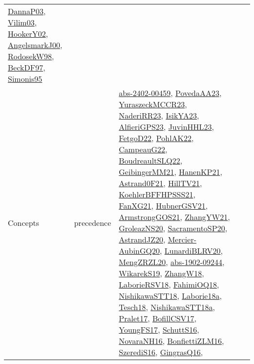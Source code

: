 {\begin{longtable}{lp{3cm}>{\raggedright}p{6cm}>{\raggedright}p{6cm}p{8cm}}
\href{papers/DannaP03.pdf}{DannaP03}\cite{DannaP03}, \href{papers/Vilim03.pdf}{Vilim03}\cite{Vilim03}, \href{papers/HookerY02.pdf}{HookerY02}\cite{HookerY02}, \href{papers/AngelsmarkJ00.pdf}{AngelsmarkJ00}\cite{AngelsmarkJ00}, \href{papers/RodosekW98.pdf}{RodosekW98}\cite{RodosekW98}, \href{papers/BeckDF97.pdf}{BeckDF97}\cite{BeckDF97}, \href{papers/Simonis95.pdf}{Simonis95}\cite{Simonis95}\\
Concepts & precedence & \href{articles/abs-2402-00459.pdf}{abs-2402-00459}\cite{abs-2402-00459}, \href{papers/PovedaAA23.pdf}{PovedaAA23}\cite{PovedaAA23}, \href{articles/YuraszeckMCCR23.pdf}{YuraszeckMCCR23}\cite{YuraszeckMCCR23}, \href{articles/NaderiRR23.pdf}{NaderiRR23}\cite{NaderiRR23}, \href{articles/IsikYA23.pdf}{IsikYA23}\cite{IsikYA23}, \href{articles/AlfieriGPS23.pdf}{AlfieriGPS23}\cite{AlfieriGPS23}, \href{papers/JuvinHHL23.pdf}{JuvinHHL23}\cite{JuvinHHL23}, \href{articles/FetgoD22.pdf}{FetgoD22}\cite{FetgoD22}, \href{articles/PohlAK22.pdf}{PohlAK22}\cite{PohlAK22}, \href{articles/CampeauG22.pdf}{CampeauG22}\cite{CampeauG22}, \href{papers/BoudreaultSLQ22.pdf}{BoudreaultSLQ22}\cite{BoudreaultSLQ22}, \href{papers/GeibingerMM21.pdf}{GeibingerMM21}\cite{GeibingerMM21}, \href{papers/HanenKP21.pdf}{HanenKP21}\cite{HanenKP21}, \href{papers/Astrand0F21.pdf}{Astrand0F21}\cite{Astrand0F21}, \href{papers/HillTV21.pdf}{HillTV21}\cite{HillTV21}, \href{articles/KoehlerBFFHPSSS21.pdf}{KoehlerBFFHPSSS21}\cite{KoehlerBFFHPSSS21}, \href{articles/FanXG21.pdf}{FanXG21}\cite{FanXG21}, \href{articles/HubnerGSV21.pdf}{HubnerGSV21}\cite{HubnerGSV21}, \href{papers/ArmstrongGOS21.pdf}{ArmstrongGOS21}\cite{ArmstrongGOS21}, \href{articles/ZhangYW21.pdf}{ZhangYW21}\cite{ZhangYW21}, \href{papers/GroleazNS20.pdf}{GroleazNS20}\cite{GroleazNS20}, \href{articles/SacramentoSP20.pdf}{SacramentoSP20}\cite{SacramentoSP20}, \href{articles/AstrandJZ20.pdf}{AstrandJZ20}\cite{AstrandJZ20}, \href{papers/Mercier-AubinGQ20.pdf}{Mercier-AubinGQ20}\cite{Mercier-AubinGQ20}, \href{articles/LunardiBLRV20.pdf}{LunardiBLRV20}\cite{LunardiBLRV20}, \href{articles/MengZRZL20.pdf}{MengZRZL20}\cite{MengZRZL20}, \href{articles/abs-1902-09244.pdf}{abs-1902-09244}\cite{abs-1902-09244}, \href{articles/WikarekS19.pdf}{WikarekS19}\cite{WikarekS19}, \href{articles/ZhangW18.pdf}{ZhangW18}\cite{ZhangW18}, \href{articles/LaborieRSV18.pdf}{LaborieRSV18}\cite{LaborieRSV18}, \href{articles/FahimiOQ18.pdf}{FahimiOQ18}\cite{FahimiOQ18}, \href{papers/NishikawaSTT18.pdf}{NishikawaSTT18}\cite{NishikawaSTT18}, \href{papers/Laborie18a.pdf}{Laborie18a}\cite{Laborie18a}, \href{papers/Tesch18.pdf}{Tesch18}\cite{Tesch18}, \href{papers/NishikawaSTT18a.pdf}{NishikawaSTT18a}\cite{NishikawaSTT18a}, \href{papers/Pralet17.pdf}{Pralet17}\cite{Pralet17}, \href{papers/BofillCSV17.pdf}{BofillCSV17}\cite{BofillCSV17}, \href{papers/YoungFS17.pdf}{YoungFS17}\cite{YoungFS17}, \href{papers/SchuttS16.pdf}{SchuttS16}\cite{SchuttS16}, \href{articles/NovaraNH16.pdf}{NovaraNH16}\cite{NovaraNH16}, \href{papers/BonfiettiZLM16.pdf}{BonfiettiZLM16}\cite{BonfiettiZLM16}, \href{papers/SzerediS16.pdf}{SzerediS16}\cite{SzerediS16}, \href{papers/GingrasQ16.pdf}{GingrasQ16}\cite{GingrasQ16}, 
\end{longtable}}
